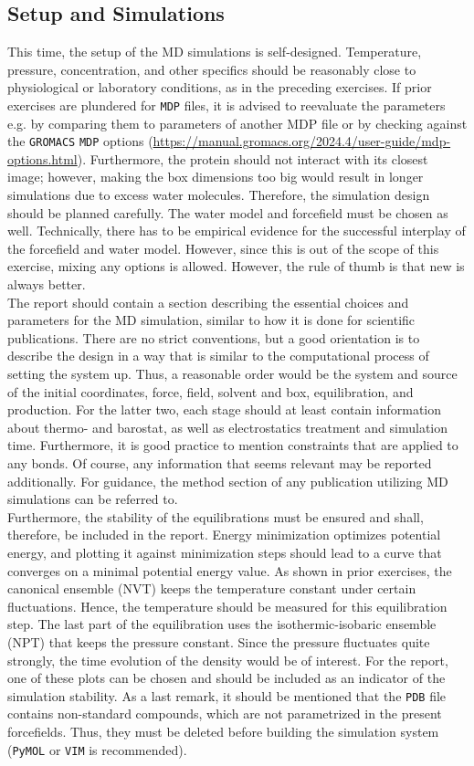 \documentclass[9pt,tutorial]{livecoms}
\begin{document}
\subsection*{Setup and Simulations}
This time, the setup of the MD simulations is self-designed. Temperature, pressure, concentration, and other specifics should be reasonably close to physiological or laboratory conditions, as in the preceding exercises. 
If prior exercises are plundered for \texttt{MDP} files, it is advised to reevaluate the parameters e.g. by comparing them to parameters of another MDP file or by checking against the \texttt{GROMACS} \texttt{MDP} options (\url{https://manual.gromacs.org/2024.4/user-guide/mdp-options.html}). Furthermore, the protein should not interact with its closest image; however, making the box dimensions too big would result in longer simulations due to excess water molecules. Therefore, the simulation design should be planned carefully. The water model and forcefield must be chosen as well. Technically, there has to be empirical evidence for the successful interplay of the forcefield and water model. However, since this is out of the scope of this exercise, mixing any options is allowed. However, the rule of thumb is that new is always better.\\
The report should contain a section describing the essential choices and parameters for the MD simulation, similar to how it is done for scientific publications. There are no strict conventions, but a good orientation is to describe the design in a way that is similar to the computational process of setting the system up. Thus, a reasonable order would be the system and source of the initial coordinates, force, field, solvent and box, equilibration, and production. For the latter two, each stage should at least contain information about thermo- and barostat, as well as electrostatics treatment and simulation time. Furthermore, it is good practice to mention constraints that are applied to any bonds. Of course, any information that seems relevant may be reported additionally. For guidance, the method section of any publication utilizing MD simulations can be referred to.\\
Furthermore, the stability of the equilibrations must be ensured and shall, therefore, be included in the report. Energy minimization optimizes potential energy, and plotting it against minimization steps should lead to a curve that converges on a minimal potential energy value. As shown in prior exercises, the canonical ensemble (NVT) keeps the temperature constant under certain fluctuations. Hence, the temperature should be measured for this equilibration step. The last part of the equilibration uses the isothermic-isobaric ensemble (NPT) that keeps the pressure constant. Since the pressure fluctuates quite strongly, the time evolution of the density would be of interest. For the report, one of these plots can be chosen and should be included as an indicator of the simulation stability. As a last remark, it should be mentioned that the \texttt{PDB} file contains non-standard compounds, which are not parametrized in the present forcefields. Thus, they must be deleted before building the simulation system (\texttt{PyMOL} or \texttt{VIM} is recommended). 
\end{document}

